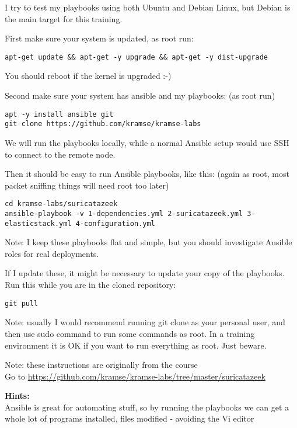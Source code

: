 \documentclass[a4paper,11pt,notitlepage]{report}
\begin{document}
I try to test my playbooks using both Ubuntu and Debian Linux, but Debian is the main target for this training.

First make sure your system is updated, as root run:

\begin{verbatim}
apt-get update && apt-get -y upgrade && apt-get -y dist-upgrade
\end{verbatim}

You should reboot if the kernel is upgraded :-)

Second make sure your system has ansible and my playbooks: (as root run)
\begin{verbatim}
apt -y install ansible git
git clone https://github.com/kramse/kramse-labs
\end{verbatim}

We will run the playbooks locally, while a normal Ansible setup would use SSH to connect to the remote node.

Then it should be easy to run Ansible playbooks, like this: (again as root, most packet sniffing things will need root too later)

\begin{verbatim}
cd kramse-labs/suricatazeek
ansible-playbook -v 1-dependencies.yml 2-suricatazeek.yml 3-elasticstack.yml 4-configuration.yml
\end{verbatim}

Note: I keep these playbooks flat and simple, but you should investigate Ansible roles for real deployments.

If I update these, it might be necessary to update your copy of the playbooks. Run this while you are in the cloned repository:

\begin{verbatim}
git pull
\end{verbatim}

Note: usually I would recommend running git clone as your personal user, and then use sudo command to run some commands as root. In a training environment it is OK if you want to run everything as root. Just beware.

Note: these instructions are originally from the course\\
Go to \url{https://github.com/kramse/kramse-labs/tree/master/suricatazeek}

{\bf Hints:}\\
Ansible is great for automating stuff, so by running the playbooks we can get a whole lot of programs installed, files modified - avoiding the Vi editor \smiley
\end{document}
